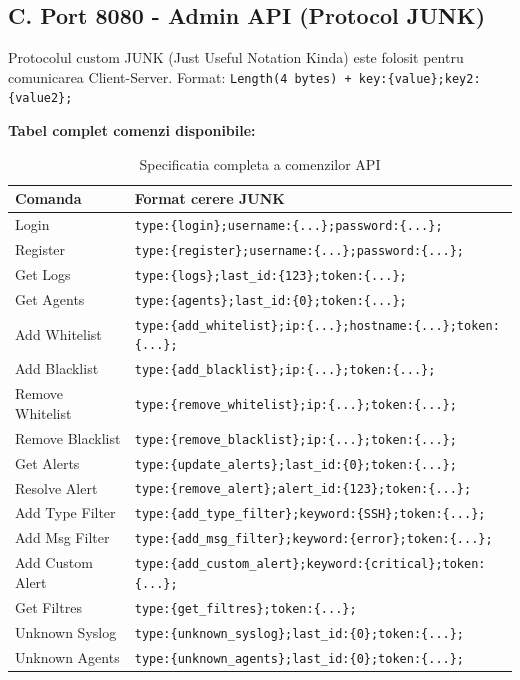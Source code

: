 \documentclass[runningheads]{llncs}
\begin{document}
\subsection{C. Port 8080 - Admin API (Protocol JUNK)}
Protocolul custom JUNK (Just Useful Notation Kinda) este folosit pentru comunicarea Client-Server.
Format: \texttt{Length(4 bytes) + key:\{value\};key2:\{value2\};}

\textbf{Tabel complet comenzi disponibile:}
\begin{table}[H]
\centering
\small
\begin{tabular}{|l|p{9.5cm}|}
\hline
\textbf{Comanda} & \textbf{Format cerere JUNK} \\ \hline
Login & \texttt{type:\{login\};username:\{...\};password:\{...\};} \\ \hline
Register & \texttt{type:\{register\};username:\{...\};password:\{...\};} \\ \hline
Get Logs & \texttt{type:\{logs\};last\_id:\{123\};token:\{...\};} \\ \hline
Get Agents & \texttt{type:\{agents\};last\_id:\{0\};token:\{...\};} \\ \hline
Add Whitelist & \texttt{type:\{add\_whitelist\};ip:\{...\};hostname:\{...\};token:\{...\};} \\ \hline
Add Blacklist & \texttt{type:\{add\_blacklist\};ip:\{...\};token:\{...\};} \\ \hline
Remove Whitelist & \texttt{type:\{remove\_whitelist\};ip:\{...\};token:\{...\};} \\ \hline
Remove Blacklist & \texttt{type:\{remove\_blacklist\};ip:\{...\};token:\{...\};} \\ \hline
Get Alerts & \texttt{type:\{update\_alerts\};last\_id:\{0\};token:\{...\};} \\ \hline
Resolve Alert & \texttt{type:\{remove\_alert\};alert\_id:\{123\};token:\{...\};} \\ \hline
Add Type Filter & \texttt{type:\{add\_type\_filter\};keyword:\{SSH\};token:\{...\};} \\ \hline
Add Msg Filter & \texttt{type:\{add\_msg\_filter\};keyword:\{error\};token:\{...\};} \\ \hline
Add Custom Alert & \texttt{type:\{add\_custom\_alert\};keyword:\{critical\};token:\{...\};} \\ \hline
Get Filtres & \texttt{type:\{get\_filtres\};token:\{...\};} \\ \hline
Unknown Syslog & \texttt{type:\{unknown\_syslog\};last\_id:\{0\};token:\{...\};} \\ \hline
Unknown Agents & \texttt{type:\{unknown\_agents\};last\_id:\{0\};token:\{...\};} \\ \hline
\end{tabular}
\caption{Specificatia completa a comenzilor API}
\end{table}
\end{document}
